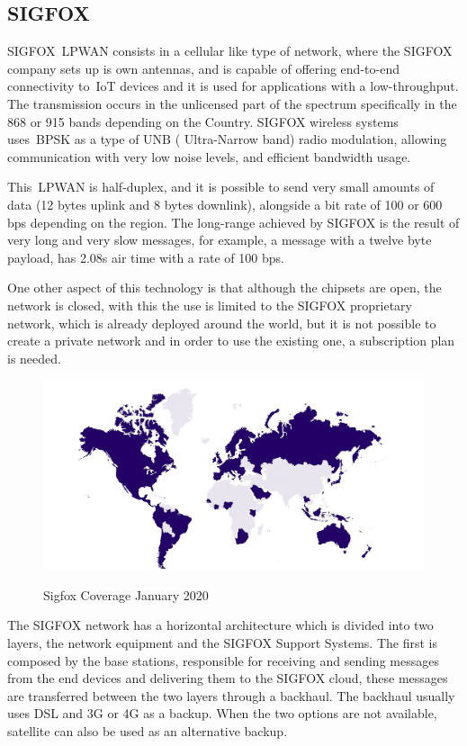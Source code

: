 
\newpage
\subsection{SIGFOX} %
\label{sec:SIGFOX_sota}


SIGFOX~\gls{LPWAN} consists in a cellular like type of network, where the SIGFOX company sets up is own antennas, and is capable of offering end-to-end connectivity to~\gls{IoT} devices and it is used  for applications with a low-throughput. The transmission occurs in the unlicensed part of the spectrum specifically in the 868 or 915 bands depending on the Country. SIGFOX wireless systems uses~\gls{BPSK} as a type of UNB ( Ultra-Narrow band) radio modulation, allowing communication with very low noise levels, and efficient bandwidth usage. 

This~\gls{LPWAN} is half-duplex, and it is possible to send very small amounts of data (12 bytes uplink and 8 bytes downlink), alongside a bit rate of 100 or 600 bps depending on the region. The long-range achieved by SIGFOX is the result of very long and very slow messages, for example, a message with a twelve byte payload, has 2.08s air time  with a rate of 100 bps. 

One other aspect of this technology is that although the chipsets are open, the network is closed, with this the use is limited to the SIGFOX proprietary network, which is already deployed around the world, but it is not possible to create a private network and in order to use the existing one, a subscription plan is needed.\newline
\begin{figure}[htbp]
  \centering
  
    {\includegraphics[width=0.9\linewidth]{Chapters/Figures/coverage-map-jan-20.jpg}}%
 
  \caption{Sigfox Coverage January 2020~\cite{SIGSITE}}
  \label{fig:Sigfox_Coverage}
\end{figure}\newline
The SIGFOX network has a horizontal architecture which is divided into two layers, the network equipment and the SIGFOX Support Systems. The first is composed by the base stations, responsible for receiving and sending messages from the end devices and delivering them to the SIGFOX cloud, these messages are transferred between the two layers through a backhaul. The backhaul usually uses DSL and 3G or 4G as a backup. When the two options are not available, satellite can also be used as an alternative backup. 

